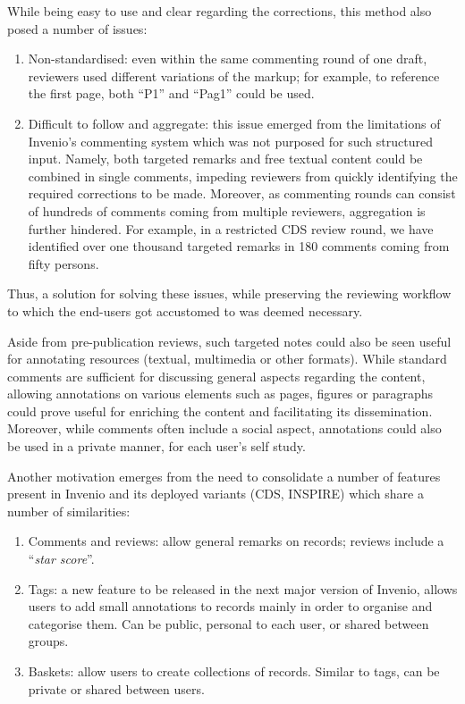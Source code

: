 While being easy to use and clear regarding the corrections, this method also
posed a number of issues:
  \begin{enumerate}
    \item Non-standardised: even within the same commenting round of one draft,
      reviewers used different variations of the markup; for example, to
      reference the first page, both ``P1'' and ``Pag1'' could be used.
    \item Difficult to follow and aggregate: this issue emerged from the
      limitations of Invenio's commenting system which was not purposed for such
      structured input. Namely, both targeted remarks and free textual content
      could be combined in single comments, impeding reviewers from quickly
      identifying the required corrections to be made. Moreover, as commenting
      rounds can consist of hundreds of comments coming from multiple reviewers,
      aggregation is further hindered. For example, in a restricted CDS review
      round, we have identified over one thousand targeted remarks in 180
      comments coming from fifty persons.
  \end{enumerate}
Thus, a solution for solving these issues, while preserving the reviewing
workflow to which the end-users got accustomed to was deemed necessary.

Aside from pre-publication reviews, such targeted notes could also be seen
useful for annotating resources (textual, multimedia or other formats). While
standard comments are sufficient for discussing general aspects regarding the
content, allowing annotations on various elements such as pages, figures or
paragraphs could prove useful for enriching the content and facilitating its
dissemination. Moreover, while comments often include a social aspect,
annotations could also be used in a private manner, for each user's self study.

Another motivation emerges from the need to consolidate a number of features
present in Invenio and its deployed variants (CDS, INSPIRE) which share a number
of similarities:
\begin{enumerate}
  \item Comments and reviews: allow general remarks on records; reviews include
    a ``\textit{star score}''.
  \item Tags: a new feature to be released in the next major version of Invenio,
    allows users to add small annotations to records mainly in order to
    organise and categorise them. Can be public, personal to each user, or
    shared between groups.
  \item Baskets: allow users to create collections of records. Similar to tags,
    can be private or shared between users.
\end{enumerate}

